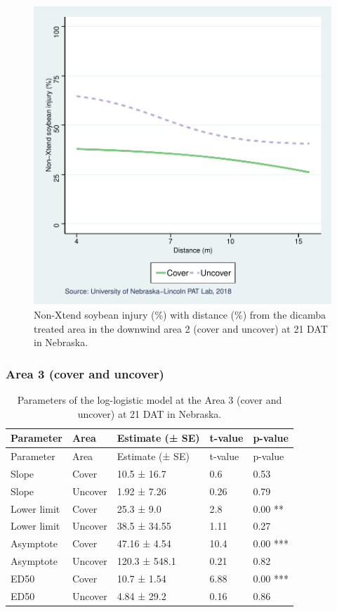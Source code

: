 \documentclass[]{article}
\begin{document}
\begin{figure}
\centering
\includegraphics{Report_Dicamba_study_files/figure-latex/unnamed-chunk-71-1.pdf}
\caption{Non-Xtend soybean injury (\%) with distance (\%) from the
dicamba treated area in the downwind area 2 (cover and uncover) at 21
DAT in Nebraska.}
\end{figure}

\newpage

\subsubsection{Area 3 (cover and
uncover)}\label{area-3-cover-and-uncover}

\begin{longtable}[]{@{}lllll@{}}
\caption{Parameters of the log-logistic model at the Area 3 (cover and
uncover) at 21 DAT in Nebraska.}\tabularnewline
\toprule
Parameter & Area & Estimate (± SE) & t-value & p-value\tabularnewline
\midrule
\endfirsthead
\toprule
Parameter & Area & Estimate (± SE) & t-value & p-value\tabularnewline
\midrule
\endhead
Slope & Cover & 10.5 ± 16.7 & 0.6 & 0.53\tabularnewline
Slope & Uncover & 1.92 ± 7.26 & 0.26 & 0.79\tabularnewline
Lower limit & Cover & 25.3 ± 9.0 & 2.8 & 0.00 **\tabularnewline
Lower limit & Uncover & 38.5 ± 34.55 & 1.11 & 0.27\tabularnewline
Asymptote & Cover & 47.16 ± 4.54 & 10.4 & 0.00 ***\tabularnewline
Asymptote & Uncover & 120.3 ± 548.1 & 0.21 & 0.82\tabularnewline
ED50 & Cover & 10.7 ± 1.54 & 6.88 & 0.00 ***\tabularnewline
ED50 & Uncover & 4.84 ± 29.2 & 0.16 & 0.86\tabularnewline
\bottomrule
\end{longtable}
\end{document}
